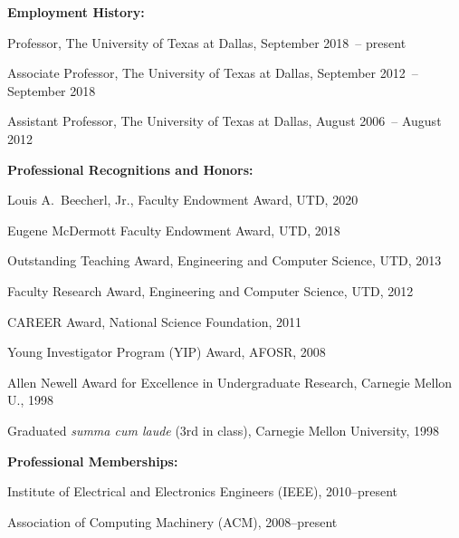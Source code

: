 \documentclass[doublespacing]{utdthesis}
\begin{document}
\begin{vita}
  \bigskip

  {\large\bfseries Employment History:\par}
  \medskip
  Professor, The University of Texas at Dallas,
    September 2018~-- present\par
  Associate Professor, The University of Texas at Dallas,
    September 2012~-- September 2018\par
  Assistant Professor, The University of Texas at Dallas,
    August 2006~-- August 2012\par

  \bigskip

  {\large\bfseries Professional Recognitions and Honors:\par}
  \medskip
  Louis A.~Beecherl, Jr., Faculty Endowment Award, UTD, 2020\par
  Eugene McDermott Faculty Endowment Award, UTD, 2018\par
  Outstanding Teaching Award, Engineering and Computer Science, UTD, 2013\par
  Faculty Research Award, Engineering and Computer Science, UTD, 2012\par
  CAREER Award, National Science Foundation, 2011\par
  Young Investigator Program (YIP) Award, AFOSR, 2008\par
  Allen Newell Award for Excellence in Undergraduate Research,
    Carnegie Mellon U., 1998\par
  Graduated \textit{summa cum laude} (3rd in class), Carnegie Mellon University, 1998\par

  \bigskip

  {\large\bfseries Professional Memberships:\par}
  \medskip
  Institute of Electrical and Electronics Engineers (IEEE), 2010--present\par
  Association of Computing Machinery (ACM), 2008--present\par

\end{vita}  %
\end{document}

